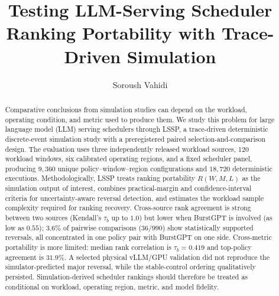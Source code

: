 \documentclass[acmsmall,screen]{acmart}
\title{Testing LLM-Serving Scheduler Ranking Portability with Trace-Driven Simulation}
\author{Soroush Vahidi}
\affiliation{\institution{New Jersey Institute of Technology}\city{Newark}\state{New Jersey}\country{USA}}
\begin{document}
\begin{abstract}
Comparative conclusions from simulation studies can depend on the workload,
operating condition, and metric used to produce them. We study this problem
for large language model (LLM) serving schedulers through LSSP, a
trace-driven deterministic discrete-event simulation study with a
preregistered paired selection-and-comparison design. The evaluation uses
three independently released workload sources, 120 workload windows, six
calibrated operating regions, and a fixed scheduler panel, producing
$9{,}360$ unique policy--window--region configurations and $18{,}720$
deterministic executions. Methodologically, LSSP treats ranking portability
$R(W,M,L)$ as the simulation output of interest, combines practical-margin
and confidence-interval criteria for uncertainty-aware reversal detection,
and estimates the workload sample complexity required for ranking recovery.
Cross-source rank agreement is strong between two sources (Kendall's
$\tau_b$ up to $1.0$) but lower when BurstGPT is involved (as low as
$0.55$); $3.6\%$ of pairwise comparisons ($36/990$) show statistically
supported reversals, all concentrated in one policy pair with BurstGPT on
one side. Cross-metric portability is more limited: median rank correlation
is $\tau_b=0.419$ and top-policy agreement is $31.9\%$. A selected physical
vLLM/GPU validation did not reproduce the simulator-predicted major
reversal, while the stable-control ordering qualitatively persisted.
Simulation-derived scheduler rankings should therefore be treated as
conditional on workload, operating region, metric, and model fidelity.
\end{abstract}

\maketitle















\end{document}
